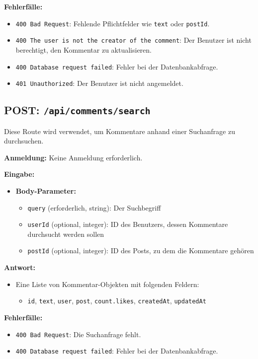 \documentclass[a4paper,12pt]{article}
\begin{document}
\textbf{Fehlerfälle:}
\begin{itemize}
    \item \texttt{400 Bad Request}: Fehlende Pflichtfelder wie \texttt{text} oder \texttt{postId}.
    \item \texttt{400 The user is not the creator of the comment}: Der Benutzer ist nicht berechtigt, den Kommentar zu aktualisieren.
    \item \texttt{400 Database request failed}: Fehler bei der Datenbankabfrage.
    \item \texttt{401 Unauthorized}: Der Benutzer ist nicht angemeldet.
\end{itemize}

\newpage
\subsection{POST: \texttt{/api/comments/search}}

Diese Route wird verwendet, um Kommentare anhand einer Suchanfrage zu durchsuchen.

\textbf{Anmeldung:} Keine Anmeldung erforderlich.

\textbf{Eingabe:}
\begin{itemize}
    \item \textbf{Body-Parameter:}
    \begin{itemize}
        \item \texttt{query} (erforderlich, string): Der Suchbegriff
        \item \texttt{userId} (optional, integer): ID des Benutzers, dessen Kommentare durchsucht werden sollen
        \item \texttt{postId} (optional, integer): ID des Posts, zu dem die Kommentare gehören
    \end{itemize}
\end{itemize}

\textbf{Antwort:}
\begin{itemize}
    \item Eine Liste von Kommentar-Objekten mit folgenden Feldern:
    \begin{itemize}
        \item \texttt{id}, \texttt{text}, \texttt{user}, \texttt{post}, \texttt{count.likes}, \texttt{createdAt}, \texttt{updatedAt}
    \end{itemize}
\end{itemize}

\textbf{Fehlerfälle:}
\begin{itemize}
    \item \texttt{400 Bad Request}: Die Suchanfrage fehlt.
    \item \texttt{400 Database request failed}: Fehler bei der Datenbankabfrage.
\end{itemize}
\end{document}

